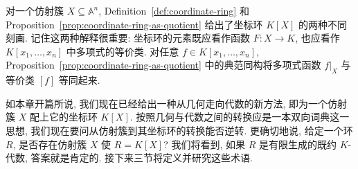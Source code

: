 对一个仿射簇 $X\subseteq\mathbb{A}^{n}$, Definition~\ref{def:coordinate-ring} 和 Proposition~\ref{prop:coordinate-ring-as-quotient} 给出了坐标环 $K[X]$ 的两种不同刻画. 记住这两种解释很重要: 坐标环的元素既应看作函数 $F:X\to K$, 也应看作 $K[x_{1},\ldots,x_{n}]$ 中多项式的等价类. 对任意 $f\in K[x_{1},\ldots,x_{n}]$, Proposition~\ref{prop:coordinate-ring-as-quotient} 中的典范同构将多项式函数 $f|_{X}$ 与等价类 $[f]$ 等同起来.

如本章开篇所说, 我们现在已经给出一种从几何走向代数的新方法, 即为一个仿射簇 $X$ 配上它的坐标环 $K[X]$. 按照几何与代数之间的转换应是一本双向词典这一思想, 我们现在要问从仿射簇到其坐标环的转换能否逆转. 更确切地说, 给定一个环 $R$, 是否存在仿射簇 $X$ 使 $R=K[X]$? 我们将看到, 如果 $R$ 是有限生成的既约 $K$-代数, 答案就是肯定的. 接下来三节将定义并研究这些术语.

\BookExerciseHeading
